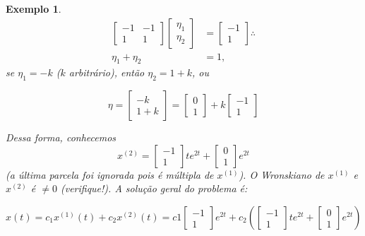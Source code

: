 \documentclass[a4paper,portuguese,9pt,final]{extarticle}
\newtheorem{example}{Exemplo}[section]
\begin{document}
\begin{multicols*}{2}
\begin{example}
                \begin{equation*}
                    \begin{split}
                        \begin{bmatrix}
                                     -1 & -1\\
                                     1& 1
                        \end{bmatrix} \begin{bmatrix} \eta_1 \\ \eta_2 \end{bmatrix} &= \begin{bmatrix} -1 \\ 1 \end{bmatrix} \therefore \\
                        \eta_1 + \eta_2 &= 1,
                    \end{split}
                \end{equation*}
                se $\eta_1 = -k$ ($k$ arbitrário), então $\eta_2  = 1 +k$, ou
                
                \begin{equation*}
                    \eta = \begin{bmatrix} -k \\ 1 + k \end{bmatrix} = \begin{bmatrix} 0 \\ 1 \end{bmatrix} + k \begin{bmatrix} -1 \\ 1 \end{bmatrix}
                \end{equation*}
                
                Dessa forma, conhecemos $$x^{(2)} = \begin{bmatrix} -1 \\ 1 \end{bmatrix}te^{2t}  + \begin{bmatrix}0 \\ 1  \end{bmatrix}e^{2t}$$ (a última parcela foi ignorada pois é múltipla de $x^{(1)}$). O Wronskiano de $x^{(1)}$ e $x^{(2)}$ é $\neq 0$ (verifique!). A solução geral do problema é:
                
                \begin{equation*}
                    x(t) = c_1 x^{(1)}(t) + c_2 x^{(2)}(t) = c1 \begin{bmatrix} -1 \\ 1 \end{bmatrix}e^{2t} + c_2 (\begin{bmatrix} -1 \\1 \end{bmatrix}te^{2t}
+ \begin{bmatrix} 0 \\ 1 \end{bmatrix}e^{2t})
                \end{equation*}
                

\end{example}
\end{multicols*}
\end{document}
